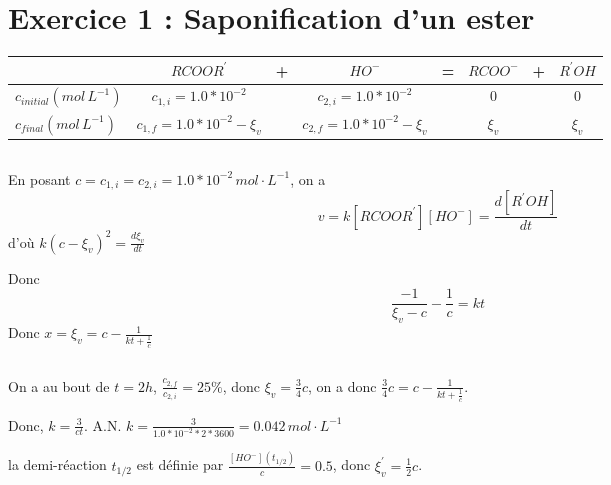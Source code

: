 \documentclass[a4paper,12pt]{book}
\begin{document}
\renewcommand{\labelitemi}{$\blacktriangleright$}
\renewcommand{\labelitemii}{$\bullet$}


\section{Exercice 1 : Saponification d’un ester}
\begin{table}[h]
\begin{center}
    \begin{tabular}{l|ccccccc}
    \hline
                      & $RCOOR^{'}$      & + & $HO^{-}$       & = & $RCOO^{-}$ & + & $R^{'}OH$ \\ \hline
        $c_{initial}(mol\,L^{-1})$ & $c_{1,i}=1.0*10^{-2}$       &   & $c_{2,i}=1.0*10^{-2}$      &   & $0$ &  & $0$\\ 
        $c_{final}(mol\,L^{-1})$      & $c_{1,f}=1.0*10^{-2}-\xi_v$  &   & $c_{2,f}=1.0*10^{-2}-\xi_v$  &   & $\xi_v$ & & $\xi_v$\\ 
    \end{tabular}
\end{center}
\end{table}
\subsection{}
En posant $c=c_{1,i}=c_{2,i}=1.0*10^{-2}\,mol\cdot L^{-1}$, on a 
$$v = k[RCOOR^{'}][HO^{-}]=\frac{d[R^{'}OH]}{dt}$$
d'où $k(c-\xi_v)^2=\frac{d\xi_v}{dt}$

\hspace*{\fill} 

Donc 
$$
\frac{-1}{\xi_v-c}-\frac{1}{c}=kt
$$
Donc $\boxed{x=\xi_v=c-\frac{1}{kt+\frac{1}{c}}}$
\subsection{}
On a au bout de $t=2h$, $\frac{c_{2,f}}{c_{2,i}}=25\%$, donc $\xi_v=\frac{3}{4}c$, on a donc $\frac{3}{4}c=c-\frac{1}{kt+\frac{1}{c}}$.

\hspace*{\fill} 

Donc, $\boxed{k=\frac{3}{ct}}$. A.N. $k=\frac{3}{1.0*10^{-2}*2*3600}=0.042\,mol\cdot L^{-1}$

\hspace*{\fill} 

la demi-réaction $t_{1/2}$ est définie par $\frac{[HO^{-}](t_{1/2})}{c}=0.5$, donc $\xi_v^{'}=\frac{1}{2}c$. 

\hspace*{\fill} 
\end{document}
